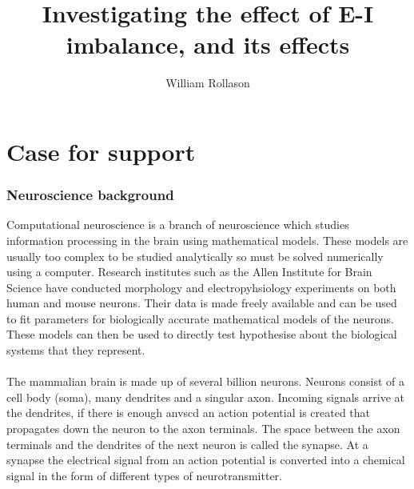 \documentclass{epsrc}
\begin{document}
\title{Investigating the effect of E-I imbalance, and its effects }
\author{William Rollason}
\maketitle

\part{Case for support}
\section{Neuroscience background}
\noindent
Computational neuroscience is a branch of neuroscience which studies information processing in the brain using mathematical models. These models are usually too complex to be studied analytically so must be solved numerically using a computer. Research institutes such as the Allen Institute for Brain Science have conducted morphology and electropyhsiology experiments on both human and mouse neurons. Their data is made freely available and can be used to fit parameters for biologically accurate mathematical models of the neurons. These models can then be used to directly test hypothesise about the biological systems that they represent. 
\\\\
The mammalian brain is made up of several billion neurons. Neurons consist of a cell body (soma), many dendrites and a singular axon. Incoming signals arrive at the dendrites, if there is enough anvscd an action potential is created that propagates down the neuron to the axon terminals. The space between the axon terminals and the dendrites of the next neuron is called the synapse. At a synapse the electrical signal from an action potential is converted into a chemical signal in the form of different types of neurotransmitter.  
\\
\end{document}
